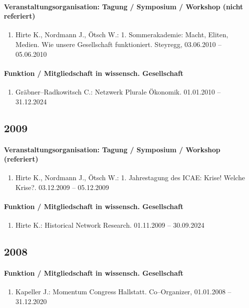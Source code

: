 \paragraph{Veranstaltungsorganisation: Tagung / Symposium / Workshop (nicht referiert)}
\begin{enumerate}[leftmargin=*, labelsep=0.5cm]
\item Hirte K., Nordmann J., Ötsch W.: 1. Sommerakademie: Macht, Eliten, Medien. Wie unsere Gesellschaft funktioniert. Steyregg, 03.06.2010 -- 05.06.2010
\end{enumerate}
\paragraph{Funktion / Mitgliedschaft in wissensch. Gesellschaft}
\begin{enumerate}[leftmargin=*, labelsep=0.5cm]
\item Gräbner--Radkowitsch C.: Netzwerk Plurale Ökonomik. 01.01.2010 -- 31.12.2024
\end{enumerate}\subsection*{2009}\paragraph{Veranstaltungsorganisation: Tagung / Symposium / Workshop (referiert)}
\begin{enumerate}[leftmargin=*, labelsep=0.5cm]
\item Hirte K., Nordmann J., Ötsch W.: 1. Jahrestagung des ICAE: Krise! Welche Krise?. 03.12.2009 -- 05.12.2009
\end{enumerate}
\paragraph{Funktion / Mitgliedschaft in wissensch. Gesellschaft}
\begin{enumerate}[leftmargin=*, labelsep=0.5cm]
\item Hirte K.: Historical Network Research. 01.11.2009 -- 30.09.2024
\end{enumerate}\subsection*{2008}\paragraph{Funktion / Mitgliedschaft in wissensch. Gesellschaft}
\begin{enumerate}[leftmargin=*, labelsep=0.5cm]
\item Kapeller J.: Momentum Congress Hallstatt. Co--Organizer, 01.01.2008 -- 31.12.2020
\end{enumerate}